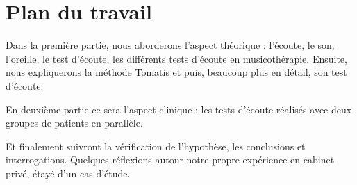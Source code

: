 \section{Plan du travail}

Dans la première partie, nous aborderons l'aspect théorique : l'écoute, le son, l'oreille, le test d'écoute, les différents tests d'écoute en musicothérapie.  Ensuite, nous expliquerons  la méthode Tomatis
et puis, beaucoup plus en détail, son test d'écoute.

En deuxième partie ce sera l'aspect clinique : les tests d'écoute réalisés  avec deux groupes de patients en parallèle.

Et finalement suivront la vérification de l'hypothèse, les conclusions et interrogations. 
Quelques réflexions autour notre propre expérience en cabinet privé, étayé d'un cas d'étude.
